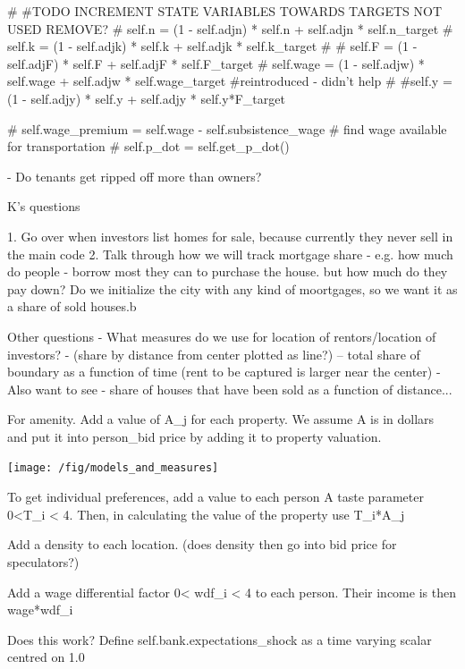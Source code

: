         # #TODO INCREMENT STATE VARIABLES TOWARDS TARGETS     NOT USED  REMOVE?
        # self.n        = (1 - self.adjn) * self.n + self.adjn * self.n_target
        # self.k        = (1 - self.adjk) * self.k + self.adjk * self.k_target 
        # # self.F        = (1 - self.adjF) * self.F + self.adjF * self.F_target
        # self.wage     = (1 - self.adjw) * self.wage + self.adjw * self.wage_target  #reintroduced  - didn't help
        # #self.y        = (1 - self.adjy) * self.y + self.adjy * self.y*F_target 

        # self.wage_premium     = self.wage - self.subsistence_wage # find wage available for transportation
        # self.p_dot            = self.get_p_dot()

    
- Do tenants get ripped off more than owners?


K's questions

1. Go over when investors list homes for sale, because currently they never sell in the main code
2. Talk through  how we will track mortgage share - e.g. how much do people - borrow most they can to purchase the house. but how much do they pay down?
Do we initialize the city with any kind of moortgages, so we want it as a share of sold houses.b


    
Other questions
- What measures do we use for location of rentors/location of investors? 
  - (share by distance from center plotted as line?) -- total share of boundary as a function of time (rent to be captured is larger near the center)
  - Also want to see - share of houses that have been sold as a function of distance... 



   

For amenity. Add a value of A_j for each property. We assume A is in dollars and put it into person_bid price by adding it to property valuation.

\texttt{[image: /fig/models\_and\_measures]}

To get individual preferences, add a value to each person A taste parameter 0<T_i < 4. Then, in calculating the value of the property use    T_i*A_j

Add a density to each location. (does density then go into bid price for speculators?) 

Add a wage differential factor 0< wdf_i < 4 to each person. Their income is then wage*wdf_i


Does this work?  Define self.bank.expectations_shock  as a time varying scalar centred on 1.0

